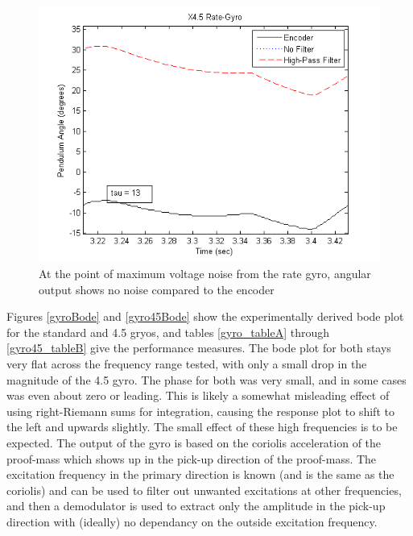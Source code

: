 \documentclass{article}
\theoremstyle{plain}
\theoremstyle{definition}
\theoremstyle{remark}
\begin{document}
\begin{figure}[hbt]
\begin{center}
\includegraphics[width = 13cm]{Example_Gyro_AngleNoise.png}
\caption{At the point of maximum voltage noise from the rate gyro, angular output shows no noise compared to the encoder}
\label{gyroAngleNoise}
\end{center}
\end{figure}

Figures \ref{gyroBode} and \ref{gyro45Bode} show the experimentally derived bode plot for the standard and 4.5 gryos, and tables \ref{gyro_tableA} through \ref{gyro45_tableB} give the performance measures. The bode plot for both stays very flat across the frequency range tested, with only a small drop in the magnitude of the 4.5 gyro. The phase for both was very small, and in some cases was even  about zero or leading. This is likely a somewhat misleading effect of using right-Riemann sums for integration, causing the response plot to shift to the left and upwards slightly. The small effect of these high frequencies is to be expected. The output of the gyro is based on the coriolis acceleration of the proof-mass which shows up in the pick-up direction of the proof-mass. The excitation frequency in the primary direction is known (and is the same as the coriolis) and can be used to filter out unwanted excitations at other frequencies, and then a demodulator is used to extract only the amplitude in the pick-up direction with (ideally) no dependancy on the outside excitation frequency. \\ 
\end{document}

